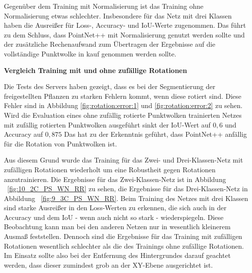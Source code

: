 \documentclass[12pt,titlepage, twoside]{article}
\begin{document}
Gegenüber dem Training mit Normalisierung ist das Training ohne Normalisierung etwas schlechter. Insbesondere für das Netz mit drei Klassen haben die Ausreißer für Loss-, Accuracy- und IoU-Werte zugenommen.
Das führt zu dem Schluss, dass PointNet++ mit Normalisierung genutzt werden sollte und der zusätzliche Rechenaufwand zum Übertragen der Ergebnisse auf die vollständige Punktwolke in kauf genommen werden sollte.

\textbf{Vergleich Training mit und ohne zufällige Rotationen}

Die Tests des Servers haben gezeigt, dass es bei der Segmentierung der freigestellten Pflanzen zu starken Fehlern kommt, wenn diese rotiert sind. 
Diese Fehler sind in Abbildung \ref{fig:rotation:error:1} und \ref{fig:rotation:error:2} zu sehen.
Wird die Evaluation eines ohne zufällig rotierte Punktwolken trainierten Netzes mit zufällig rotierten Punktwolken ausgeführt sinkt der IoU-Wert auf $0,6$ und Accuracy auf $0,875$
Das hat zu der Erkenntnis geführt, dass PointNet++ anfällig für die Rotation von Punktwolken ist. 

Aus diesem Grund wurde das Training für das Zwei- und Drei-Klassen-Netz mit zufälligen Rotationen wiederholt um eine Robustheit gegen Rotationen anzutrainieren.
Die Ergebnisse für das Zwei-Klassen-Netz ist in Abbildung ~\ref{fig:10_2C_PS_WN_RR} zu sehen, die Ergebnisse für das Drei-Klassen-Netz in Abbildung ~\ref{fig:9_3C_PS_WN_RR}. 
Beim Training des Netzes mit drei Klassen sind starke Ausreißer in den Loss-Werten zu erkennen, die sich auch in der Accuracy und dem IoU - wenn auch nicht so stark - wiederspiegeln.
Diese Beobachtung kann man bei den anderen Netzen nur in wesentlich kleinerem Ausmaß feststellen. 
Dennoch sind die Ergebnisse für das Training mit zufälligen Rotationen wesentlich schlechter als die des Trainings ohne zufällige Rotationen.
Im Einsatz sollte also bei der Entfernung des Hintergrundes darauf geachtet werden, dass dieser zumindest grob an der XY-Ebene ausgerichtet ist.
\end{document}
